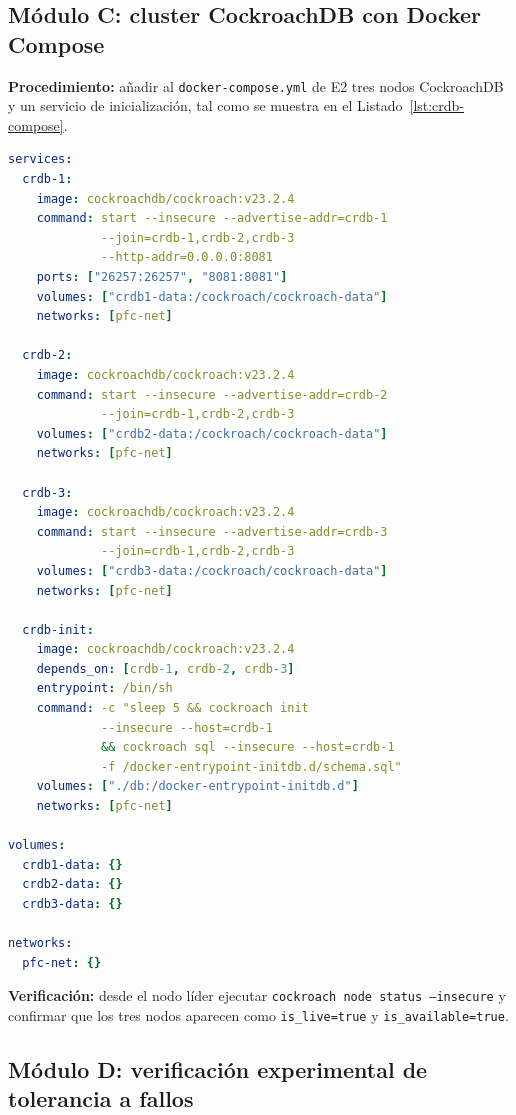 \documentclass[11pt,a4paper]{article}
\begin{document}
\subsection{Módulo C: cluster CockroachDB con Docker Compose}

    \textbf{Procedimiento:} añadir al \texttt{docker-compose.yml} de E2 tres nodos CockroachDB y un servicio de inicialización, tal como se muestra en el Listado~\ref{lst:crdb-compose}.
    \begin{lstlisting}[language=yaml,caption={Extensión del docker-compose.yml de E2 con el cluster CockroachDB.},label={lst:crdb-compose}]
services:
  crdb-1:
    image: cockroachdb/cockroach:v23.2.4
    command: start --insecure --advertise-addr=crdb-1
             --join=crdb-1,crdb-2,crdb-3
             --http-addr=0.0.0.0:8081
    ports: ["26257:26257", "8081:8081"]
    volumes: ["crdb1-data:/cockroach/cockroach-data"]
    networks: [pfc-net]

  crdb-2:
    image: cockroachdb/cockroach:v23.2.4
    command: start --insecure --advertise-addr=crdb-2
             --join=crdb-1,crdb-2,crdb-3
    volumes: ["crdb2-data:/cockroach/cockroach-data"]
    networks: [pfc-net]

  crdb-3:
    image: cockroachdb/cockroach:v23.2.4
    command: start --insecure --advertise-addr=crdb-3
             --join=crdb-1,crdb-2,crdb-3
    volumes: ["crdb3-data:/cockroach/cockroach-data"]
    networks: [pfc-net]

  crdb-init:
    image: cockroachdb/cockroach:v23.2.4
    depends_on: [crdb-1, crdb-2, crdb-3]
    entrypoint: /bin/sh
    command: -c "sleep 5 && cockroach init
             --insecure --host=crdb-1
             && cockroach sql --insecure --host=crdb-1
             -f /docker-entrypoint-initdb.d/schema.sql"
    volumes: ["./db:/docker-entrypoint-initdb.d"]
    networks: [pfc-net]

volumes:
  crdb1-data: {}
  crdb2-data: {}
  crdb3-data: {}

networks:
  pfc-net: {}
    \end{lstlisting}
    \textbf{Verificación:} desde el nodo líder ejecutar \texttt{cockroach node status --insecure} y confirmar que los tres nodos aparecen como \texttt{is\_live=true} y \texttt{is\_available=true}.

\subsection{Módulo D: verificación experimental de tolerancia a fallos}
\end{document}
